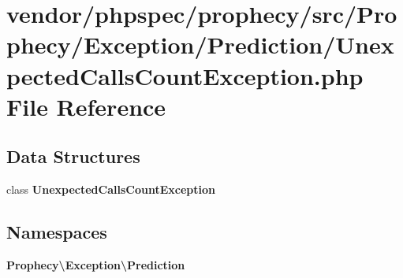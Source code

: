 \section{vendor/phpspec/prophecy/src/\+Prophecy/\+Exception/\+Prediction/\+Unexpected\+Calls\+Count\+Exception.php File Reference}
\label{_unexpected_calls_count_exception_8php}
\subsection*{Data Structures}
\begin{DoxyCompactItemize}
\item 
class {\bf Unexpected\+Calls\+Count\+Exception}
\end{DoxyCompactItemize}
\subsection*{Namespaces}
\begin{DoxyCompactItemize}
\item 
 {\bf Prophecy\textbackslash{}\+Exception\textbackslash{}\+Prediction}
\end{DoxyCompactItemize}
